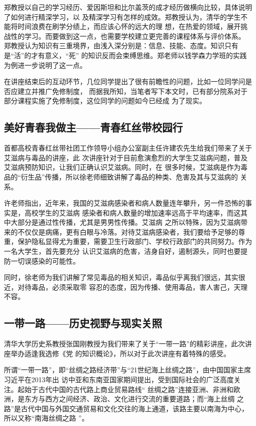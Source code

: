 \documentclass[a4paper]{cctart}
\numberwithin{equation}{section} \pagestyle{fancy}
\begin{document}
郑教授以自己的学习经历、爱因斯坦和比尔盖茨的成才经历做横向比较，具体说明了如何进行精深学习，以
及精深学习有怎样的成效。郑教授认为，清华的学生不能将时间浪费在刷学分绩上，而应该心怀的远大的理
想，在热爱的领域，展开挑战性的学习。而要做到这一点，也需要学校建立更完善的课程体系与评价体系。
郑教授认为知识有三重境界，由浅入深分别是：信息、技能、态度。知识只有是“活”的才有意义，“死”
的知识反而会束缚思维。郑老师以钱学森力学班的实践为例进一步说明了这一点。

在讲座结束后的互动环节，几位同学提出了很有前瞻性的问题，比如一位同学问是否应建立并推广免修制度，
而据我所知，当笔者写下本文时，已有部分院系对于部分课程实施了免修制度，这位同学的问题如今已经成
为了现实。
\subsection{美好青春我做主——青春红丝带校园行}
首都高校青春红丝带社团工作领导小组办公室副主任许建农先生给我们带来了关于艾滋病与毒品的讲座，此
次讲座针对于目前愈演愈烈的大学生艾滋病问题，普及艾滋病预防知识，让我们正确认识艾滋病。同时，在
很多时候，艾滋病是作为毒品的“衍生品”传播，所以徐老师细致讲解了毒品的种类、危害及其与艾滋病的
关系。

许老师指出，近年来，我国的艾滋病感染者和病人数量连年攀升，另一件恐怖的事实是，高校学生的艾滋病
感染者和病人数量的增加速率远高于平均速率，而这其中大部分是通过性传播，尤其是男男性传播。艾滋病
之所以特殊，因为艾滋病带来的不仅仅是病痛，更有白眼与冷落。对待艾滋病感染者，我们要给予足够的尊
重，保护隐私显得尤为重要，需要卫生行政部门、学校行政部门的共同努力。作为一名大学生，首先要充分
认识艾滋病的危害，洁身自好，遏制源头，同时也要提防一切误感染的可能性。

同时，徐老师为我们讲解了常见毒品的相关知识，毒品似乎离我们很远，其实很近，对待毒品，必须采取零
容忍的态度，因为传播、使用毒品，害人害己，天理不容。
\subsection{一带一路——历史视野与现实关照}
清华大学历史系教授张国刚教授为我们带来了关于“一带一路”的精彩讲座，此次讲座举办适逢我选修《党
的知识概论》，所以对于此次讲座有着特殊的感受。

所谓“一带一路”，即“丝绸之路经济带”与“21世纪海上丝绸之路”，由中国国家主席习近平在2013年出
访中亚和东南亚国家期间提出，受到国际社会的广泛高度关注。起始于古代中国的古代路上商业贸易路线“
丝绸之路”连接亚洲、非洲和欧洲，是东方与西方之间经济、政治、文化进行交流的重要道路；而“海上丝绸
之路”是古代中国与外国交通贸易和文化交往的海上通道，该路主要以南海为中心，所以又称“南海丝绸之路
”。
\end{document}
